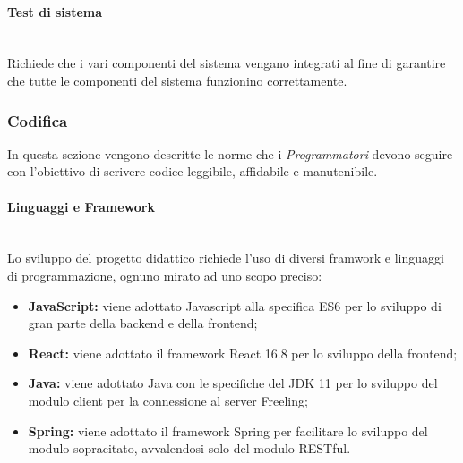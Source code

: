 \paragraph{Test di sistema}\mbox{}\\
Richiede che i vari componenti del sistema vengano integrati al fine di garantire che tutte le componenti del sistema funzionino correttamente.

\subsubsection{Codifica}
In questa sezione vengono descritte le norme che i \textit{Programmatori} devono seguire con l'obiettivo di scrivere codice leggibile, affidabile e manutenibile.

\paragraph{Linguaggi e Framework}\mbox{}\\
Lo sviluppo del progetto didattico richiede l'uso di diversi framwork e linguaggi di programmazione, ognuno mirato ad uno scopo preciso:
\begin{itemize}
	\item \textbf{JavaScript:} viene adottato Javascript alla specifica ES6 per lo sviluppo di gran parte della backend e della frontend;
	\item \textbf{React:} viene adottato il framework React 16.8 per lo sviluppo della frontend;
	\item \textbf{Java:} viene adottato Java con le specifiche del JDK 11 per lo sviluppo del modulo client per la connessione al server Freeling;
	\item \textbf{Spring:} viene adottato il framework Spring per facilitare lo sviluppo del modulo sopracitato, avvalendosi solo del modulo RESTful.
\end{itemize}

